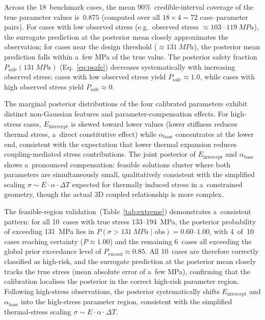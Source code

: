 \documentclass[pdflatex,sn-mathphys-num]{sn-jnl}
\theoremstyle{thmstyleone}
\theoremstyle{thmstyletwo}
\theoremstyle{thmstylethree}
\begin{document}
Across the 18~benchmark cases, the mean 90\%~credible-interval coverage of the
true parameter values is~$0.875$ (computed over all
$18 \times 4 = 72$ case--parameter pairs).
For cases with low observed stress (e.g.\ observed stress
$\approx\SI{103}{}$--$\SI{119}{MPa}$), the surrogate prediction at the posterior
mean closely approximates the observation; for cases near the design threshold
($\approx\SI{131}{MPa}$), the posterior mean prediction falls within a~few MPa
of the true value.
The posterior safety fraction $P_{\mathrm{safe}}(\SI{131}{MPa})$
(Eq.~\ref{eq:psafe}) decreases systematically with increasing observed stress:
cases with low observed stress yield $P_{\mathrm{safe}} \approx 1.0$, while cases
with high observed stress yield $P_{\mathrm{safe}} \approx 0$.

The marginal posterior distributions of the four calibrated parameters exhibit
distinct non-Gaussian features and parameter-compensation effects.
For high-stress cases, $E_{\mathrm{intercept}}$ is skewed toward lower values
(lower stiffness reduces thermal stress, a~direct constitutive effect) while
$\alpha_{\mathrm{base}}$ concentrates at the lower end, consistent with the
expectation that lower thermal expansion reduces coupling-mediated stress
contributions.
The joint posterior of $E_{\mathrm{intercept}}$ and $\alpha_{\mathrm{base}}$
shows a~pronounced compensation: feasible solutions cluster where both
parameters are simultaneously small, qualitatively consistent with the
simplified scaling $\sigma \sim E \cdot \alpha \cdot \Delta T$ expected for
thermally induced stress in a~constrained geometry, though the actual 3D
coupled relationship is more complex.

The feasible-region validation~(Table~\ref{tab:extreme}) demonstrates a~consistent
pattern: for all 10~cases with true stress 133--\SI{194}{MPa}, the posterior
probability of exceeding \SI{131}{MPa} lies in
$P(\sigma>\SI{131}{MPa}\mid\mathrm{obs}) = 0.60\text{--}1.00$, with 4~of~10
cases reaching certainty ($P \approx 1.00$) and the remaining 6~cases all
exceeding the global prior exceedance level of $P_{\mathrm{exceed}} \approx 0.85$.
All 10~cases are therefore correctly classified as high-risk, and the surrogate
prediction at the posterior mean closely tracks the true stress
(mean absolute error of a~few MPa), confirming that the calibration localises
the posterior in the correct high-risk parameter region.
Following high-stress observations, the posterior systematically shifts
$E_{\mathrm{intercept}}$ and $\alpha_{\mathrm{base}}$ into the high-stress
parameter region, consistent with the simplified thermal-stress scaling
$\sigma \sim E \cdot \alpha \cdot \Delta T$.
\end{document}
